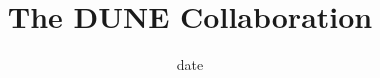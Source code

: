 \documentclass{report}
\title{The DUNE Collaboration}
\date{ {{ date }} }
\begin{document}
\renewcommand\Authfont{\small}
\renewcommand\Affilfont{\itshape}
\maketitle %
\end{document}
